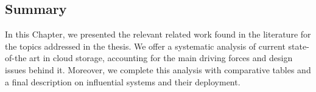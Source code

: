 \subsection*{Summary}

In this Chapter, we presented the relevant related work found in the literature for the topics addressed in the thesis. We offer a systematic analysis of current state-of-the art in cloud storage, accounting for the main driving forces and design issues behind it. Moreover, we complete this analysis with comparative tables and a final description on influential systems and their deployment.



